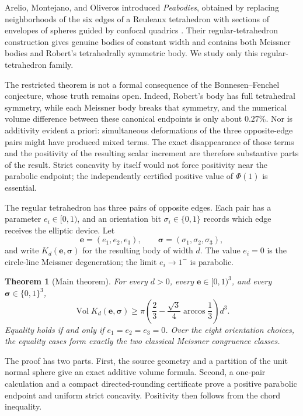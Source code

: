 \documentclass[11pt]{article}
\numberwithin{equation}{section}
\newtheorem{theorem}{Theorem}[section]
\theoremstyle{remark}
\newcommand{\Vol}{\operatorname{Vol}}
\begin{document}
Arelio, Montejano, and Oliveros introduced \emph{Peabodies}, obtained by replacing neighborhoods of the six edges of a Reuleaux tetrahedron with sections of envelopes of spheres guided by confocal quadrics \cite{ArelioMontejanoOliveros2023}.  Their regular-tetrahedron construction gives genuine bodies of constant width and contains both Meissner bodies and Robert's tetrahedrally symmetric body.  We study only this regular-tetrahedron family.

The restricted theorem is not a formal consequence of the Bonnesen--Fenchel conjecture, whose truth remains open.  Indeed, Robert's body has full tetrahedral symmetry, while each Meissner body breaks that symmetry, and the numerical volume difference between these canonical endpoints is only about $0.27\%$.  Nor is additivity evident a priori: simultaneous deformations of the three opposite-edge pairs might have produced mixed terms.  The exact disappearance of those terms and the positivity of the resulting scalar increment are therefore substantive parts of the result.  Strict concavity by itself would not force positivity near the parabolic endpoint; the independently certified positive value of $\Phi(1)$ is essential.

The regular tetrahedron has three pairs of opposite edges.  Each pair has a parameter \(e_i\in[0,1)\), and an orientation bit \(\sigma_i\in\{0,1\}\) records which edge receives the elliptic device.  Let
\[
  \mathbf e=(e_1,e_2,e_3),\qquad
  \boldsymbol\sigma=(\sigma_1,\sigma_2,\sigma_3),
\]
and write \(K_d(\mathbf e,\boldsymbol\sigma)\) for the resulting body of width \(d\).  The value \(e_i=0\) is the circle-line Meissner degeneration; the limit \(e_i\to1^-\) is parabolic.

\begin{theorem}[Main theorem]
\label{thm:main}
For every \(d>0\), every \(\mathbf e\in[0,1)^3\), and every \(\boldsymbol\sigma\in\{0,1\}^3\),
\begin{equation}
  \Vol K_d(\mathbf e,\boldsymbol\sigma)
  \ge
  \pi\left(\frac23-\frac{\sqrt3}{4}\arccos\frac13\right)d^3.
  \label{eq:main}
\end{equation}
Equality holds if and only if \(e_1=e_2=e_3=0\).  Over the eight orientation choices, the equality cases form exactly the two classical Meissner congruence classes.
\end{theorem}

The proof has two parts.  First, the source geometry and a partition of the unit normal sphere give an exact additive volume formula.  Second, a one-pair calculation and a compact directed-rounding certificate prove a positive parabolic endpoint and uniform strict concavity.  Positivity then follows from the chord inequality.
\end{document}
